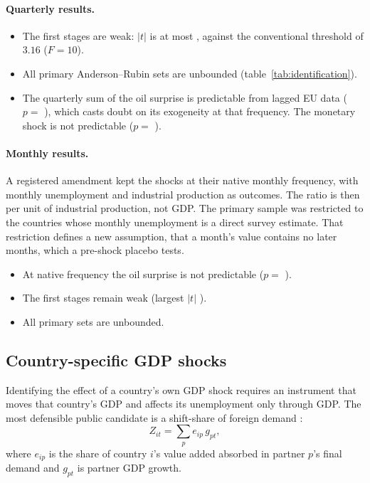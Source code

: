 \paragraph{Quarterly results.}
\begin{itemize}
  \item The first stages are weak: $|t|$ is at most , against the
    conventional threshold of $3.16$ ($F=10$).
  \item All  primary Anderson--Rubin sets are unbounded
    (table~\ref{tab:identification}).
  \item The quarterly sum of the oil surprise is predictable from lagged EU data
    ($p=$ ), which casts doubt on its exogeneity at that frequency. The
    monetary shock is not predictable ($p=$ ).
\end{itemize}

\paragraph{Monthly results.} A registered amendment kept the shocks at their native monthly
frequency, with monthly unemployment and industrial production as outcomes. The ratio is
then per unit of industrial production, not GDP. The primary sample was restricted to the
 countries whose monthly unemployment is a direct survey estimate. That restriction
defines a new assumption, that a month's value contains no later months, which a pre-shock
placebo tests.
\begin{itemize}
  \item At native frequency the oil surprise is not predictable ($p=$
    ).
  \item The first stages remain weak (largest $|t|$ ).
  \item All  primary sets are unbounded.
\end{itemize}

\subsection{Country-specific GDP shocks}

Identifying the effect of a country's own GDP shock requires an instrument that moves that
country's GDP and affects its unemployment only through GDP. The most defensible public
candidate is a shift-share of foreign demand
\citep{goldsmith2020bartik,borusyak2022shiftshare,adao2019shiftshare}:
\[
  Z_{it}=\sum_p e_{ip}\,g_{pt},
\]
where $e_{ip}$ is the share of country $i$'s value added absorbed in partner $p$'s final
demand \citep{oecd2025tiva} and $g_{pt}$ is partner GDP growth.

